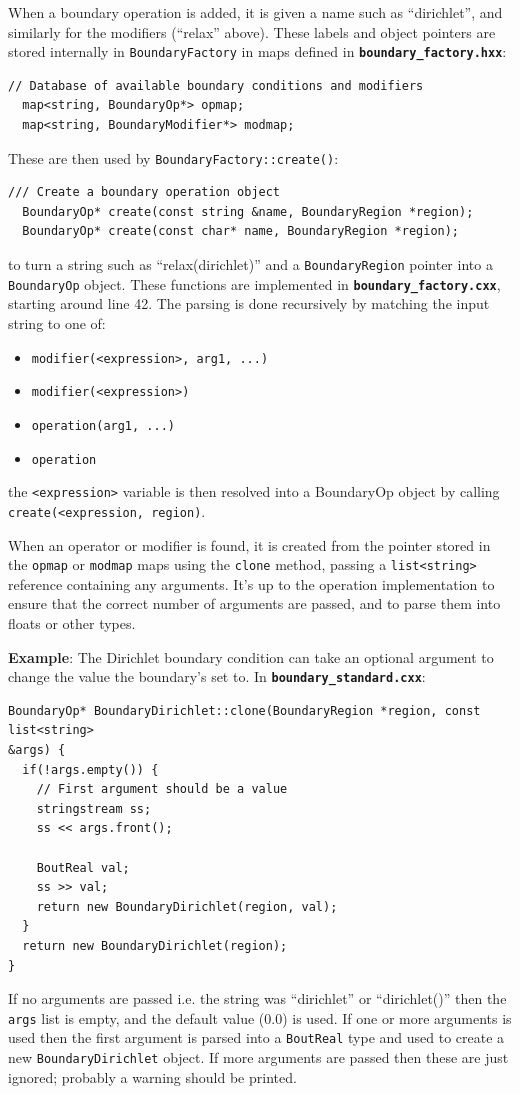 \documentclass[12pt]{article}
\newcommand{\code}[1]{\texttt{#1}}
\newcommand{\file}[1]{\texttt{\bf #1}}
\begin{document}
When a boundary operation is added, it is given a name such as ``dirichlet'',
and similarly for the modifiers (``relax'' above).  These labels and object
pointers are stored internally in \code{BoundaryFactory} in maps defined in
\file{boundary\_factory.hxx}:
%
\begin{lstlisting}[firstnumber=43]
  // Database of available boundary conditions and modifiers
  map<string, BoundaryOp*> opmap;
  map<string, BoundaryModifier*> modmap;
\end{lstlisting}
%
These are then used by \code{BoundaryFactory::create()}:
%
\begin{lstlisting}[firstnumber=24]
  /// Create a boundary operation object
  BoundaryOp* create(const string &name, BoundaryRegion *region);
  BoundaryOp* create(const char* name, BoundaryRegion *region);
\end{lstlisting}
%
to turn a string such as ``relax(dirichlet)'' and a \code{BoundaryRegion}
pointer into a \code{BoundaryOp} object. These functions are implemented in
\file{boundary\_factory.cxx}, starting around line 42. The parsing is done
recursively by matching the input string to one of:
%
\begin{itemize}
\item \code{modifier(<expression>, arg1, ...)}
\item \code{modifier(<expression>)}
\item \code{operation(arg1, ...)}
\item \code{operation}
\end{itemize}
%
the \code{<expression>} variable is then resolved into a BoundaryOp object by
calling \code{create(<expression, region)}.

When an operator or modifier is found, it is created from the pointer stored in
the \code{opmap} or \code{modmap} maps using the \code{clone} method, passing a
\code{list<string>} reference containing any arguments. It's up to the
operation implementation to ensure that the correct number of arguments are
passed, and to parse them into floats or other types.

{\bf Example}: The Dirichlet boundary condition can take an optional argument
to change the value the boundary's set to. In \file{boundary\_standard.cxx}:
%
%
\begin{lstlisting}[firstnumber=13]
BoundaryOp* BoundaryDirichlet::clone(BoundaryRegion *region, const list<string> 
&args) {
  if(!args.empty()) {
    // First argument should be a value
    stringstream ss;
    ss << args.front();

    BoutReal val;
    ss >> val;
    return new BoundaryDirichlet(region, val);
  }
  return new BoundaryDirichlet(region);
}
\end{lstlisting}
%
If no arguments are passed i.e. the string was ``dirichlet'' or ``dirichlet()''
then the \code{args} list is empty, and the default value (0.0) is used.  If
one or more arguments is used then the first argument is parsed into a
\code{BoutReal} type and used to create a new \code{BoundaryDirichlet} object.
If more arguments are passed then these are just ignored; probably a warning
should be printed.
\end{document}
